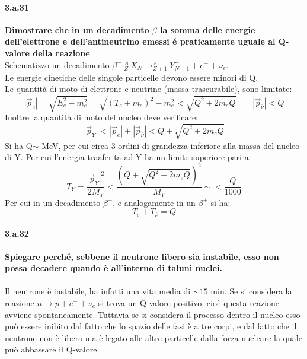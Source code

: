 \documentclass[twoside]{article}
\begin{document}
\paragraph{3.a.31}\textbf{Dimostrare che in un decadimento $\beta$ la somma delle energie dell'elettrone e dell'antineutrino emessi é praticamente uguale al Q-valore della reazione}\\
Schematizzo un decadimento $\beta^-: _Z^AX_N\to^A_{Z+1}Y_{N-1}^++e^-+\bar{\nu_e}$.\\
Le energie cinetiche delle singole particelle devono essere minori di Q.\\
Le quantità di moto di elettrone e neutrine (massa trascurabile), sono limitate:
\begin{equation}
    |\vec{p}_e|=\sqrt{E_e^2-m_e^2}=\sqrt{(T_e+m_e)^2-m_e^2}<\sqrt{Q^2+2m_eQ} \qquad |\vec{p}_{\bar{\nu}}|<Q
\end{equation}
Inoltre la quantità di moto del nucleo deve verificare:
\begin{equation}
    |\vec{p}_Y|<|\vec{p}_e|+|\vec{p}_{\bar{\nu}}|<Q+\sqrt{Q^2+2m_eQ}
\end{equation}
Si ha Q$\sim$ MeV, per cui circa 3 ordini di grandezza inferiore alla massa del nucleo di Y. Per cui l'energia traaferita ad Y ha un limite superiore pari a:
\begin{equation}
    T_Y=\frac{|\vec{p}_Y|^2}{2M_Y}<\frac{(Q+\sqrt{Q^2+2m_eQ})^2}{M_Y}\sim< \frac{Q}{1000}
\end{equation}
Per cui in un decadimento $\beta^-$, e analogamente in un $\beta^+$ si ha:
\begin{equation}
    T_e+T_{\bar{\nu}}=Q
\end{equation}

\paragraph{3.a.32}\textbf{Spiegare perché, sebbene il neutrone libero sia instabile, esso non possa decadere quando è all'interno di taluni nuclei.}\\
\\
Il neutrone è instabile, ha infatti una vita media di $\sim 15$ min. Se si considera la reazione $n\rightarrow p+e^-+\bar{\nu}_e$ si trova un Q valore positivo, cioè questa reazione avviene spontaneamente. Tuttavia se si considera il processo dentro il nucleo esso può essere inibito dal fatto che lo spazio delle fasi è a tre corpi, e dal fatto che il neutrone non è libero ma è legato alle altre particelle dalla forza nucleare la quale può abbassare il Q-valore.
\\
\end{document}

